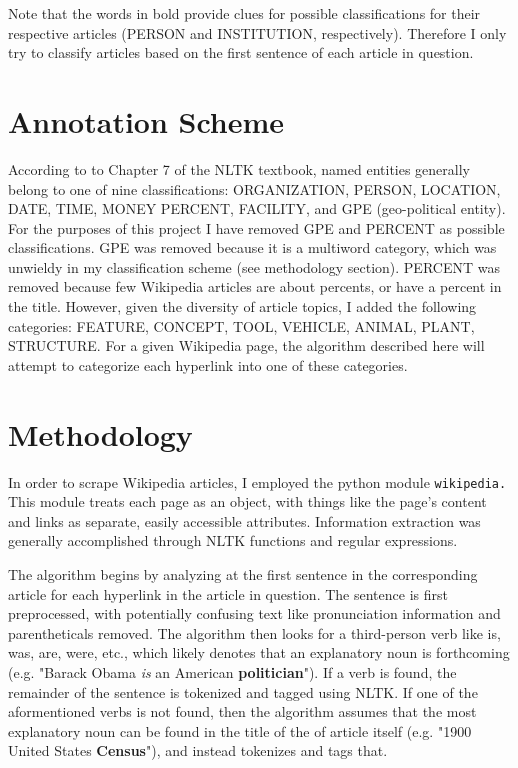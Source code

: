 \documentclass[12pt]{article}
\begin{document}
Note that the words in bold provide clues for possible classifications for their respective articles (PERSON and INSTITUTION, respectively). Therefore I only try to classify articles based on the first sentence of each article in question.

\section{Annotation Scheme}
\label{sec:orgheadline3}

According to to Chapter 7 of the NLTK textbook, named entities generally belong to one of nine classifications: ORGANIZATION, PERSON, LOCATION, DATE, TIME, MONEY PERCENT, FACILITY, and GPE (geo-political entity). For the purposes of this project I have removed GPE and PERCENT as possible classifications. GPE was removed because it is a multiword category, which was unwieldy in my classification scheme (see methodology section). PERCENT was removed because few Wikipedia articles are about percents, or have a percent in the title. However, given the diversity of article topics, I added the following categories: FEATURE, CONCEPT, TOOL, VEHICLE, ANIMAL, PLANT, STRUCTURE. For a given Wikipedia page, the algorithm described here will attempt to categorize each hyperlink into one of these categories.

\section{Methodology}
\label{sec:orgheadline5}

In order to scrape Wikipedia articles, I employed the python module \texttt{wikipedia.} This module treats each page as an object, with things like the page's content and links as separate, easily accessible attributes. Information extraction was generally accomplished through NLTK functions and regular expressions.

The algorithm begins by analyzing at the first sentence in the corresponding article for each hyperlink in the article in question. The sentence is first preprocessed, with potentially confusing text like pronunciation information and parentheticals removed. The algorithm then looks for a third-person verb like is, was, are, were, etc., which likely denotes that an explanatory noun is forthcoming (e.g. "Barack Obama \emph{is} an American \textbf{politician}"). If a verb is found, the remainder of the sentence is tokenized and tagged using NLTK. If one of the aformentioned verbs is not found, then the algorithm assumes that the most explanatory noun can be found in the title of the of article itself (e.g. "1900 United States \textbf{Census}"), and instead tokenizes and tags that. 
\end{document}
